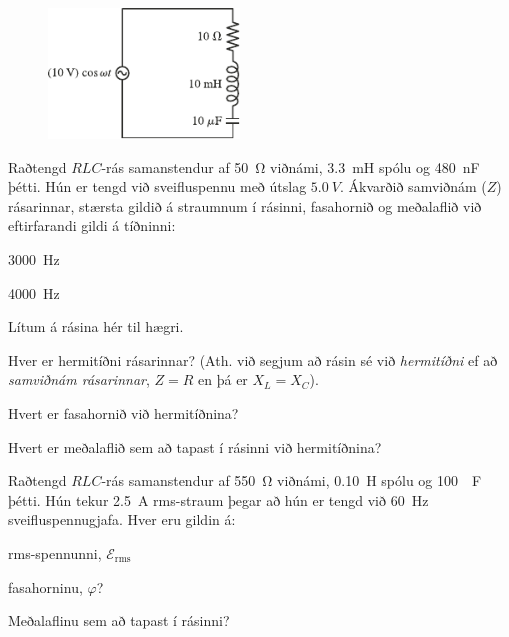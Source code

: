 \ifdefined \wholebook \else\documentclass[oneside]{book}\usepackage{EdlBook}\graphicspath{{figures/}}
\begin{document}
\begin{enumerate}[label = \textbf{(\alph*)}]

\begin{minipage}{\linewidth}
\begin{figure}
\vspace{-0.5cm}
\includegraphics[width = 2in]{figures/rk3232.pdf}
\end{figure}


\item[\textbf{(32.30)}] Raðtengd $RLC$-rás samanstendur af \SI{50}{\ohm} viðnámi, \SI{3.3}{mH} spólu og \SI{480}{nF} þétti. Hún er tengd við sveifluspennu með útslag $\SI{5.0}{V}$. Ákvarðið samviðnám ($Z$) rásarinnar, stærsta gildið á straumnum í rásinni, fasahornið og meðalaflið við eftirfarandi gildi á tíðninni: \begin{enumerate*}[label = \textbf{(\alph*)}]
    \item \SI{3000}{Hz} \item \SI{4000}{Hz}
\end{enumerate*}

\item[\textbf{(32.32)}] Lítum á rásina hér til hægri. \begin{enumerate*}[label = \textbf{(\alph*)}]
    \item Hver er hermitíðni rásarinnar? (Ath. við segjum að rásin sé við \emph{hermitíðni} ef að \emph{samviðnám rásarinnar}, $Z = R$ en þá er $X_L = X_C$).
    \item Hvert er fasahornið við hermitíðnina?
    \item Hvert er meðalaflið sem að tapast í rásinni við hermitíðnina?
\end{enumerate*}

\end{minipage}

\vspace{0.25cm}

\item[\textbf{(32.52)}] Raðtengd $RLC$-rás samanstendur af \SI{550}{\ohm} viðnámi, \SI{0.10}{H} spólu og \SI{100}{\mu F} þétti. Hún tekur \SI{2.5}{A} rms-straum þegar að hún er tengd við \SI{60}{Hz} sveifluspennugjafa. Hver eru gildin á: \begin{enumerate*}[label = \textbf{(\alph*)}]
    \item rms-spennunni, $\mathcal{E}_{\text{rms}}$
    \item fasahorninu, $\varphi$?
    \item Meðalaflinu sem að tapast í rásinni?
\end{enumerate*}


\end{enumerate}
\end{document}
